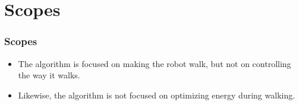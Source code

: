 \section{Scopes}
\begin{frame}
	\frametitle{Scopes}
	\begin{itemize}
		\item The algorithm is focused on making the robot walk, but not on controlling the way it walks.
		\item Likewise, the algorithm is not focused on optimizing energy during walking.
	\end{itemize}
\end{frame}